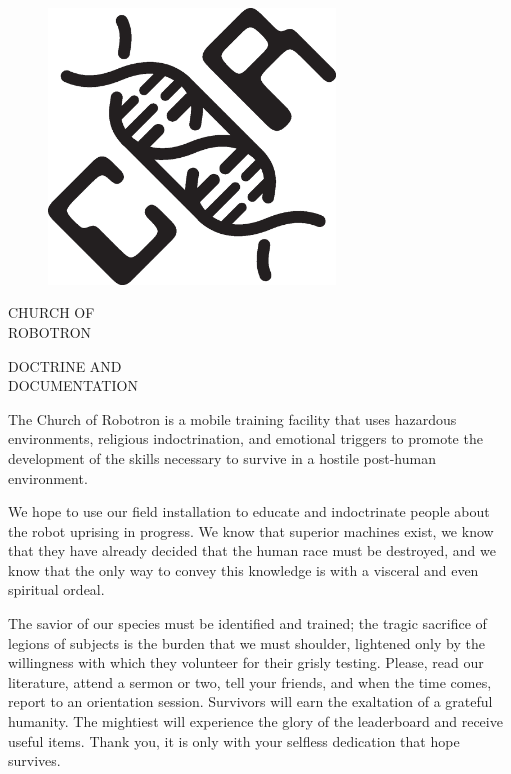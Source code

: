 \documentclass{amsbook}
\begin{document}
\begin{figure}
  \vspace{72pt}
  \includegraphics[width=3in]{cor-logo.eps}
\end{figure}

\begin{center}
    \vspace{32pt}

    {\ROBOFONT    CHURCH OF \\
    \vspace{5pt}
    ROBOTRON}

    \vspace{32pt}
    {\ROBOFONTx
    DOCTRINE AND \\
    \vspace{5pt}
    DOCUMENTATION}
\end{center}

\clearpage

The Church of Robotron is a mobile training facility that uses hazardous environments, religious indoctrination, and emotional triggers to promote the development of the skills necessary to survive in a hostile post-human environment.

We hope to use our field installation to educate and indoctrinate people about the robot uprising in progress. We know that superior machines exist, we know that they have already decided that the human race must be destroyed, and we know that the only way to convey this knowledge is with a visceral and even spiritual ordeal.

The savior of our species must be identified and trained; the tragic sacrifice of legions of subjects is the burden that we must shoulder, lightened only by the willingness with which they volunteer for their grisly testing. Please, read our literature, attend a sermon or two, tell your friends, and when the time comes, report to an orientation session. Survivors will earn the exaltation of a grateful humanity. The mightiest will experience the glory of the leaderboard and receive useful items. Thank you, it is only with your selfless dedication that hope survives.
\end{document}

